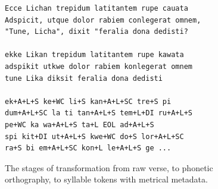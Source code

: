 \documentclass[
    twocolumn,
    hf,
]{ceurart}
\begin{document}
\begin{figure}[h]
    \footnotesize
    \begin{verbatim}
Ecce Lichan trepidum latitantem rupe cauata
Adspicit, utque dolor rabiem conlegerat omnem,
"Tune, Licha", dixit "feralia dona dedisti?

ekke Likan trepidum latitantem rupe kawata
adspikit utkwe dolor rabiem konlegerat omnem
tune Lika diksit feralia dona dedisti

ek+A+L+S ke+WC li+S kan+A+L+SC tre+S pi
dum+A+L+SC la ti tan+A+L+S tem+L+DI ru+A+L+S
pe+WC ka wa+A+L+S ta+L EOL ad+A+L+S
spi kit+DI ut+A+L+S kwe+WC do+S lor+A+L+SC
ra+S bi em+A+L+SC kon+L le+A+L+S ge ...
\end{verbatim}
    \normalsize
    \caption{The stages of transformation from raw verse, to phonetic orthography,
        to syllable tokens with metrical metadata.}
    \label{fig:syl_transform}
\end{figure}
\end{document}
